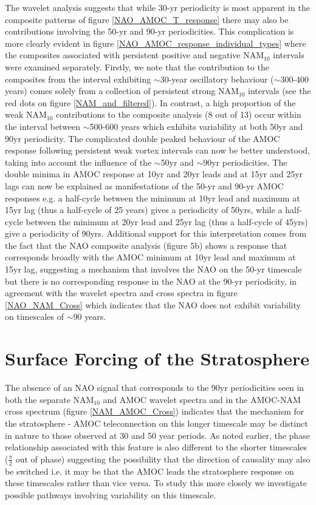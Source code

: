 The wavelet analysis suggests that while 30-yr periodicity is most apparent in the composite patterns of figure \ref{NAO_AMOC_T_response} there may also be contributions involving the 50-yr and 90-yr periodicities. This complication is more clearly evident in figure \ref{NAO_AMOC_response_individual_types} where the composites associated with persistent positive and negative NAM$_{10}$ intervals were examined separately. Firstly, we note that the contribution to the composites from the interval exhibiting $\sim$30-year oscillatory behaviour ($\sim$300-400 years) comes solely from a collection of persistent strong NAM$_{10}$ intervals (see the red dots on figure \ref{NAM_and_filtered}). In contrast, a high proportion of the weak NAM$_{10}$ contributions to the composite analysis (8 out of 13) occur within the interval between $\sim$500-600 years which exhibits variability at both 50yr and 90yr periodicity. The complicated double peaked behaviour of the AMOC response following persistent weak vortex intervals can now be better understood, taking into account the influence of the $\sim$50yr and $\sim$90yr periodicities. The double minima in AMOC response at 10yr and 20yr leads and at 15yr and 25yr lags can now be explained as manifestations of the 50-yr and 90-yr AMOC responses e.g. a half-cycle between the minimum at 10yr lead and maximum at 15yr lag (thus a half-cycle of 25 years) gives a periodicity of 50yrs, while a half-cycle between the minimum at 20yr lead and 25yr lag (thus a half-cycle of 45yrs) give a periodicity of 90yrs.  Additional support for this interpretation comes from the fact that the NAO composite analysis (figure 5b) shows a response that corresponds broadly with the AMOC minimum at 10yr lead and maximum at 15yr lag, suggesting a mechanism that involves the NAO on the 50-yr timescale but there is no corresponding response in the NAO at the 90-yr periodicity, in agreement with  the wavelet spectra and cross spectra in figure \ref{NAO_NAM_Cross} which indicates that the NAO does not exhibit variability on timescales of $\sim$90 years. 

\section{Surface Forcing of the Stratosphere}\label{surface-strat_forcing}
The absence of an NAO signal that corresponds to the 90yr periodicities seen in both the separate NAM$_{10}$ and AMOC wavelet spectra and in the  AMOC-NAM cross spectrum (figure \ref{NAM_AMOC_Cross}) indicates that the mechanism for the stratosphere - AMOC teleconnection on this longer timescale may be distinct in nature to those observed at 30 and 50 year periods. As noted earlier, the phase relationship associated with this feature is also different to the shorter timescales ($\frac{\pi}{2}$ out of phase) suggesting the possibility that the direction of causality may also be switched i.e. it may be that the AMOC leads the stratosphere response on these timescales rather than vice versa. To study this more closely we investigate possible pathways involving variability on this timescale.

